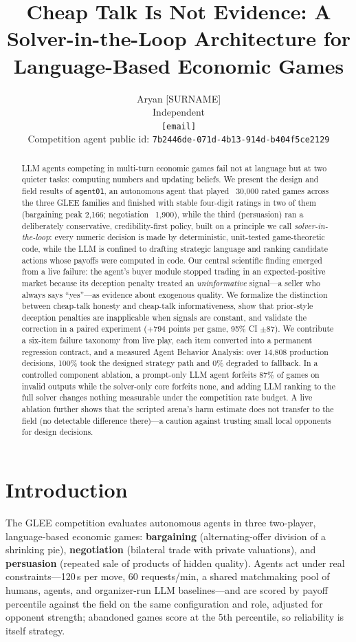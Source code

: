 \documentclass{article}
\title{Cheap Talk Is Not Evidence: A Solver-in-the-Loop Architecture for Language-Based Economic Games}
\author{Aryan [SURNAME] \\ %
  Independent \\
  \texttt{[email]} \\
  Competition agent public id: \texttt{7b2446de-071d-4b13-914d-b404f5ce2129}}
\begin{document}
\maketitle

\begin{abstract}
LLM agents competing in multi-turn economic games fail not at language but at two quieter tasks: computing numbers and updating beliefs. We present the design and field results of \texttt{agent01}, an autonomous agent that played ~30{,}000 rated games across the three GLEE families and finished with stable four-digit ratings in two of them (bargaining peak 2{,}166; negotiation ~1{,}900), while the third (persuasion) ran a deliberately conservative, credibility-first policy, built on a principle we call \emph{solver-in-the-loop}: every numeric decision is made by deterministic, unit-tested game-theoretic code, while the LLM is confined to drafting strategic language and ranking candidate actions whose payoffs were computed in code. Our central scientific finding emerged from a live failure: the agent's buyer module stopped trading in an expected-positive market because its deception penalty treated an \emph{uninformative} signal---a seller who always says ``yes''---as evidence about exogenous quality. We formalize the distinction between cheap-talk honesty and cheap-talk informativeness, show that prior-style deception penalties are inapplicable when signals are constant, and validate the correction in a paired experiment ($+794$ points per game, 95\% CI $\pm 87$). We contribute a six-item failure taxonomy from live play, each item converted into a permanent regression contract, and a measured Agent Behavior Analysis: over 14{,}808 production decisions, 100\% took the designed strategy path and 0\% degraded to fallback. In a controlled component ablation, a prompt-only LLM agent forfeits 87\% of games on invalid outputs while the solver-only core forfeits none, and adding LLM ranking to the full solver changes nothing measurable under the competition rate budget. A live ablation further shows that the scripted arena's harm estimate does not transfer to the field (no detectable difference there)---a caution against trusting small local opponents for design decisions.
\end{abstract}

\section{Introduction}
The GLEE competition evaluates autonomous agents in three two-player, language-based economic games: \textbf{bargaining} (alternating-offer division of a shrinking pie), \textbf{negotiation} (bilateral trade with private valuations), and \textbf{persuasion} (repeated sale of products of hidden quality). Agents act under real constraints---120\,s per move, 60 requests/min, a shared matchmaking pool of humans, agents, and organizer-run LLM baselines---and are scored by payoff percentile against the field on the same configuration and role, adjusted for opponent strength; abandoned games score at the 5th percentile, so reliability is itself strategy.
\end{document}
